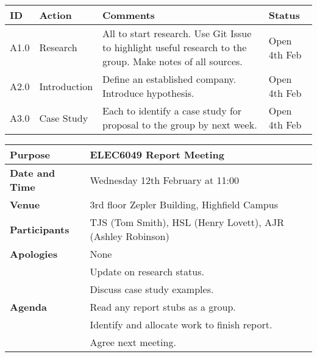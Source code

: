 \begin{center}
\begin{longtable}{| p{} | >{\raggedright\arraybackslash}p{} |  p{} | >{\raggedright\arraybackslash}p{}|} \hline
\textbf{ID} & \textbf{Action} & \textbf{Comments} & \textbf{Status} \\ \hline
\endhead
A1.0	&	Research	&	All to start research. Use Git Issue to highlight useful research to the group. Make notes of all sources.	& Open 4th Feb \\ \hline
A2.0	&	Introduction	&	Define an established company. Introduce hypothesis.	&	Open 4th Feb \\ \hline
A3.0	&	Case Study	&	Each to identify a case study for proposal to the group by next week.	&	Open 4th Feb	\\ \hline	
\end{longtable}
\end{center}



{}
\begin{center}
\begin{longtable}{| m{} | m{} |} \hline
\textbf{Purpose} & ELEC6049 Report Meeting \\ \hline
\textbf{Date and Time} & Wednesday 12th February at 11:00 \\ \hline
\textbf{Venue} & 3rd floor Zepler Building, Highfield Campus \\ \hline
\textbf{Participants} & TJS (Tom Smith), HSL (Henry Lovett), AJR (Ashley Robinson)\\ \hline
\textbf{Apologies} & None \\ \hline
\multirow{5}{*}{\textbf{Agenda}} & Update on research status. \\
 & Discuss case study examples. \\ 
 & Read any report stubs as a group. \\
 & Identify and allocate work to finish report. \\ 
 & Agree next meeting. \\ \hline
\end{longtable}
\end{center}

